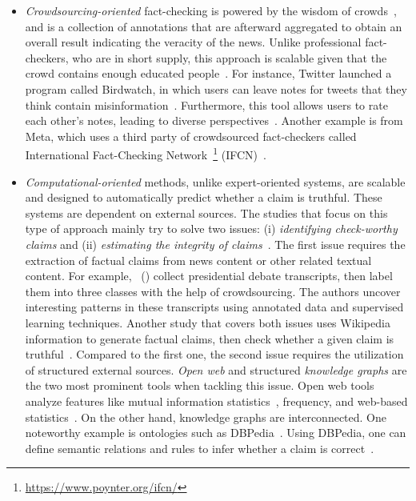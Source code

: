 \begin{description}
\begin{itemize}
        \item \emph{Crowdsourcing-oriented} fact-checking is powered by the wisdom of crowds~\parencite{WisdomOfCrowds_Galton}, and is a collection of annotations that are afterward aggregated to obtain an overall result indicating the veracity of the news. Unlike professional fact-checkers, who are in short supply, this approach is scalable given that the crowd contains enough educated people~\parencite{ScalingUpFactChecking_Allen}.  For instance, Twitter launched a program called Birdwatch, in which users can leave notes for tweets that they think contain misinformation~\parencite{BirdwatchOverview_Twitter}. Furthermore, this tool allows users to rate each other’s notes, leading to diverse perspectives~\parencite{DiversityOfPerspectives_Twitter}. Another example is from Meta, which uses a third party of crowdsourced fact-checkers called International Fact-Checking Network~\footnote{\url{https://www.poynter.org/ifcn/}} (IFCN)~\parencite{MetaFactCheckingProgram_Meta}.
        \item \emph{Computational-oriented} methods, unlike expert-oriented systems, are scalable and designed to automatically predict whether a claim is truthful. These systems are dependent on external sources. The studies that focus on this type of approach mainly try to solve two issues: (i) \emph{identifying check-worthy claims} and (ii) \emph{estimating the integrity of claims}~\parencite{FakeNewsDetectionOnSocialMediaADataMiningPerspective_Shu}. The first issue requires the extraction of factual claims from news content or other related textual content. For example,~\citeauthor{DetectingCheckWorthyClaims_Hassan} (\citeyear{DetectingCheckWorthyClaims_Hassan}) collect presidential debate transcripts, then label them into three classes with the help of crowdsourcing. The authors uncover interesting patterns in these transcripts using annotated data and supervised learning techniques. Another study that covers both issues uses Wikipedia information to generate factual claims, then check whether a given claim is truthful~\parencite{FEVER_Thorne}. Compared to the first one, the second issue requires the utilization of structured external sources. \emph{Open web} and structured \emph{knowledge graphs} are the two most prominent tools when tackling this issue. Open web tools analyze features like mutual information statistics~\parencite{UnsupervisedNamedEntityExtraction_Etzioni}, frequency, and web-based statistics~\parencite{WebBasedStatisticalFactChecking_Magdy}.  On the other hand, knowledge graphs are interconnected. One noteworthy example is ontologies such as DBPedia~\parencite{DBPedia_Auer}. Using DBPedia, one can define semantic relations and rules to infer whether a claim is correct~\parencite{SemanticFakeNewsDetection_Bracsoveanu}.
    \end{itemize}
\end{description}
